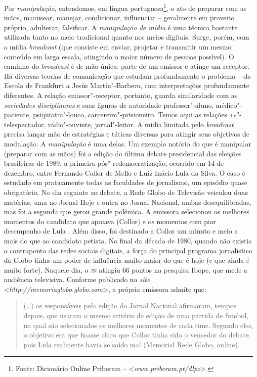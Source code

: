Por \emph{manipulação}, entendemos, em língua portuguesa\footnote{Fonte:
  Dicionário Online Priberam -- \textless{}\emph{www.priberam.pt/dlpo}\textgreater{}.}, o
ato de preparar com as mãos, manusear, manejar, condicionar, influenciar
-- geralmente em proveito próprio, adulterar, falsificar. A
\emph{manipulação de mídia} é uma técnica bastante utilizada tanto no
meio tradicional quanto nos meios digitais. Surge, porém, com a mídia
\emph{broadcast} (que consiste em enviar, projetar e transmitir um mesmo
conteúdo em larga escala, atingindo o maior número de pessoas possível).
O caminho do \emph{broadcast} é de mão única: parte de um emissor e
atinge um receptor. Há diversas teorias de comunicação que estudam
profundamente o problema -- da Escola de Frankfurt a Jesús
Martín"-Barbero, com interpretações profundamente diferentes. A relação
emissor"-receptor, portanto, guarda similaridade com as \emph{sociedades
disciplinares} e suas figuras de autoridade professor"-aluno,
médico"-paciente, psiquiatra"-louco, carcereiro"-prisioneiro. Temos aqui as
relações \textsc{tv}"-telespectador, rádio"-ouvinte, jornal"-leitor. A mídia
limitada pelo \emph{broadcast} precisa lançar mão de estratégias e
táticas diversas para atingir seus objetivos de modulação. A
\emph{manipulação} é uma delas. Um exemplo notório do que é manipular
(preparar com as mãos) foi a edição do último debate presidencial das
eleições brasileiras de 1989, a primeira pós"-redemocratização, ocorrido
em 14 de dezembro, entre Fernando Collor de Mello e Luiz Inácio Lula da
Silva. O caso é estudado em praticamente todas as faculdades de
jornalismo, um episódio quase obrigatório. No dia seguinte ao debate, a
Rede Globo de Televisão veiculou duas matérias, uma no Jornal Hoje e
outra no Jornal Nacional, ambas desequilibradas, mas foi a segunda que
gerou grande polêmica. A emissora selecionou os melhores momentos do
candidato que apoiava (Collor) e os momentos com pior desempenho de Lula
. Além disso, foi destinado a Collor um minuto e meio a mais do que ao
candidato petista. No final da década de 1980, quando não existia o
contraponto das redes sociais digitais, a força do principal programa
jornalístico da Globo tinha um poder de influência muito maior do que é
hoje (e que ainda é muito forte). Naquele dia, o \textsc{jn} atingiu 66 pontos na
pesquisa Ibope, que mede a audiência televisiva. Conforme publicado no
\emph{site} \textless{}\emph{http://memoriaglobo.globo.com}\textgreater{}, a própria emissora admite que:

\begin{quote}
(\ldots{}) os responsáveis pela edição do Jornal Nacional afirmaram, tempos
depois, que usaram o mesmo critério de edição de uma partida de futebol,
na qual são selecionados os melhores momentos de cada time. Segundo
eles, o objetivo era que ficasse claro que Collor tinha sido o vencedor
do debate, pois Lula realmente havia se saído mal (Memorial Rede Globo,
online).
\end{quote}

